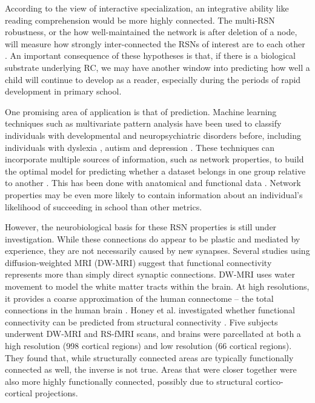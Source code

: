 According to the view of interactive specialization, an integrative ability like reading comprehension would be more highly connected. The multi-RSN robustness, or the how well-maintained the network is after deletion of a node, will measure how strongly inter-connected the RSNs of interest are to each other \cite{Bullmore2009}. An important consequence of these hypotheses is that, if there is a biological substrate underlying RC, we may have another window into predicting how well a child will continue to develop as a reader, especially during the periods of rapid development in primary school.

One promising area of application is that of prediction. Machine learning techniques such as multivariate pattern analysis have been used to classify individuals with developmental and neuropsychiatric disorders before, including individuals with dyslexia \cite{Ecker2010, Hoeft2011, Wee2014, Hoeft2007, Ingalhalikar2014}, autism and depression \cite{Lord2012}.  These techniques can incorporate multiple sources of information, such as network properties, to build the optimal model for predicting whether a dataset belongs in one group relative to another \cite{Pereira2009}. This has been done with anatomical and functional data \cite{Hoeft2007, Hoeft2007b}. Network properties may be even more likely to contain information about an individual's likelihood of succeeding in school than other metrics.

However, the neurobiological basis for these RSN properties is still under investigation. While these connections do appear to be plastic and mediated by experience, they are not necessarily caused by new synapses. Several studies using diffusion-weighted MRI (DW-MRI) suggest that functional connectivity represents more than simply direct synaptic connections. DW-MRI uses water movement to model the white matter tracts within the brain. At high resolutions, it provides a coarse approximation of the human connectome -- the total connections in the human brain \cite{Sporns2005}. Honey et al. investigated whether functional connectivity can be predicted from structural connectivity \cite{Honey2009}. Five subjects underwent DW-MRI and RS-fMRI scans, and brains were parcellated at both a high resolution (998 cortical regions) and low resolution (66 cortical regions). They found that, while structurally connected areas are typically functionally connected as well, the inverse is not true. Areas that were closer together were also more highly functionally connected, possibly due to structural cortico-cortical projections. 

